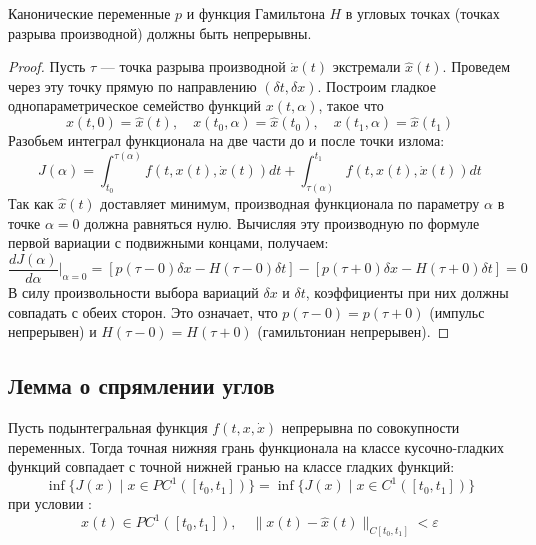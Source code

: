 \begin{theorem}
Канонические переменные $p$ и функция Гамильтона $H$ в угловых точках (точках разрыва производной) должны быть непрерывны.
\end{theorem}
\begin{proof}
Пусть $\tau$ --- точка разрыва производной $\dot{x}(t)$ экстремали $\hat{x}(t)$.
Проведем через эту точку прямую по направлению $(\delta t, \delta x)$.
Построим гладкое однопараметрическое семейство функций $x(t, \alpha)$, такое что 
  $$x(t, 0) = \hat{x}(t), \quad x(t_0, \alpha) = \hat{x}(t_0), \quad x(t_1, \alpha) = \hat{x}(t_1)$$
Разобьем интеграл функционала на две части до и после точки излома:
$$ J(\alpha) = \int_{t_0}^{\tau(\alpha)} f(t, x(t), \dot{x}(t)) dt + \int_{\tau(\alpha)}^{t_1} f(t, x(t), \dot{x}(t)) dt $$ 
Так как $\hat{x}(t)$ доставляет минимум, производная функционала по параметру $\alpha$ в точке $\alpha = 0$
должна равняться нулю. Вычисляя эту производную по формуле первой вариации с подвижными концами, получаем:
\begin{equation}
\frac{d J(\alpha)}{d\alpha}\bigg|_{\alpha=0} = [p(\tau-0)\delta x - H(\tau-0)\delta t] - [p(\tau+0)\delta x - H(\tau+0)\delta t] = 0 
\end{equation} 
В силу произвольности выбора вариаций $\delta x$ и $\delta t$, коэффициенты при них должны совпадать с обеих сторон. 
Это означает, что $p(\tau-0) = p(\tau+0)$ (импульс непрерывен) и $H(\tau-0) = H(\tau+0)$ (гамильтониан непрерывен).
\end{proof}

\subsection{Лемма о спрямлении углов}

\begin{lemma}
Пусть подынтегральная функция $f(t, x, \dot{x})$ непрерывна по совокупности переменных. 
Тогда точная нижняя грань функционала на классе кусочно-гладких функций совпадает с точной нижней гранью на классе гладких функций:
$$ \inf \{ J(x) \mid x \in PC^1([t_0, t_1]) \} = \inf \{ J(x) \mid x \in C^1([t_0, t_1]) \} $$
  при условии : 
  $$x(t) \in PC^1([t_0, t_1]), \quad \|x(t) - \hat{x}(t)\|_{C[t_0, t_1]} < \varepsilon$$
\end{lemma}

